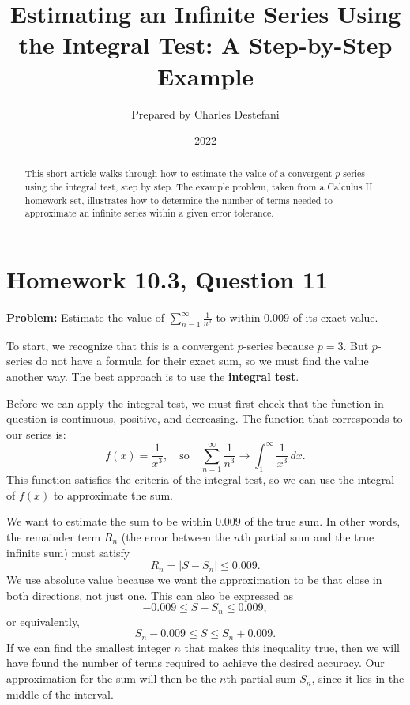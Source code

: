 \documentclass[reqno,14pt]{amsart}
\title[Estimating a Series with the Integral Test]{Estimating an Infinite Series Using the Integral Test: A Step-by-Step Example}
\author{Prepared by Charles Destefani}
\date{2022}
\theoremstyle{plain}
\begin{document}
\maketitle

\begin{abstract}
This short article walks through how to estimate the value of a convergent $p$-series using the integral test, step by step. The example problem, taken from a Calculus II homework set, illustrates how to determine the number of terms needed to approximate an infinite series within a given error tolerance.
\end{abstract}

\section*{Homework 10.3, Question 11}

\textbf{Problem:} Estimate the value of $\displaystyle \sum_{n=1}^\infty \frac{1}{n^3}$ to within $0.009$ of its exact value.

\medskip

To start, we recognize that this is a convergent $p$-series because $p = 3$. But $p$-series do not have a formula for their exact sum, so we must find the value another way. The best approach is to use the \textbf{integral test}.

Before we can apply the integral test, we must first check that the function in question is continuous, positive, and decreasing. The function that corresponds to our series is:
\[
    f(x) = \frac{1}{x^3}, \quad \text{so} \quad \sum_{n=1}^\infty \frac{1}{n^3} \longrightarrow \int_1^\infty \frac{1}{x^3}\,dx.
\]
This function satisfies the criteria of the integral test, so we can use the integral of $f(x)$ to approximate the sum.

\medskip

We want to estimate the sum to be within $0.009$ of the true sum. In other words, the remainder term $R_n$ (the error between the $n$th partial sum and the true infinite sum) must satisfy
\[
    R_n = |S - S_n| \le 0.009.
\]
We use absolute value because we want the approximation to be that close in both directions, not just one. This can also be expressed as
\[
    -0.009 \le S - S_n \le 0.009,
\]
or equivalently,
\[
    S_n - 0.009 \le S \le S_n + 0.009.
\]
If we can find the smallest integer $n$ that makes this inequality true, then we will have found the number of terms required to achieve the desired accuracy. Our approximation for the sum will then be the $n$th partial sum $S_n$, since it lies in the middle of the interval.
\end{document}
